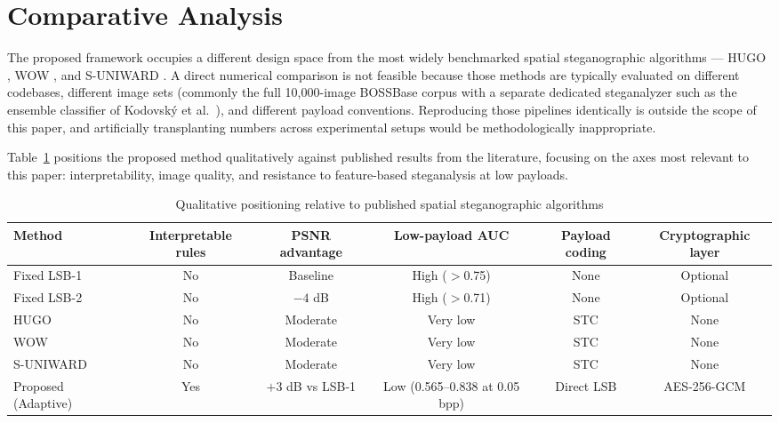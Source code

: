 \section{Comparative Analysis}
\label{sec:comparison}

The proposed framework occupies a different design space from the most widely benchmarked spatial steganographic algorithms --- HUGO \cite{pevny2010}, WOW \cite{holub2012}, and S-UNIWARD \cite{holub2014}. A direct numerical comparison is not feasible because those methods are typically evaluated on different codebases, different image sets (commonly the full 10,000-image BOSSBase corpus with a separate dedicated steganalyzer such as the ensemble classifier of Kodovsk{\'y} et al.\ \cite{kodovsky2012ensemble}), and different payload conventions. Reproducing those pipelines identically is outside the scope of this paper, and artificially transplanting numbers across experimental setups would be methodologically inappropriate.

Table~\ref{tab:qual_compare} positions the proposed method qualitatively against published results from the literature, focusing on the axes most relevant to this paper: interpretability, image quality, and resistance to feature-based steganalysis at low payloads.

\begin{table}[H]
\centering
\caption{Qualitative positioning relative to published spatial steganographic algorithms}
\label{tab:qual_compare}
\begin{adjustbox}{max width=\textwidth}
\begin{tabular}{lccccc}
\toprule
Method & Interpretable rules & PSNR advantage & Low-payload AUC & Payload coding & Cryptographic layer \\
\midrule
Fixed LSB-1 & No  & Baseline  & High ($>$0.75) & None    & Optional \\
Fixed LSB-2 & No  & $-4$ dB   & High ($>$0.71) & None    & Optional \\
HUGO \cite{pevny2010}       & No  & Moderate  & Very low        & STC     & None \\
WOW \cite{holub2012}        & No  & Moderate  & Very low        & STC     & None \\
S-UNIWARD \cite{holub2014}  & No  & Moderate  & Very low        & STC     & None \\
Proposed (Adaptive)         & Yes & $+3$ dB vs LSB-1 & Low (0.565--0.838 at 0.05 bpp) & Direct LSB & AES-256-GCM \\
\bottomrule
\end{tabular}
\end{adjustbox}
\end{table}

